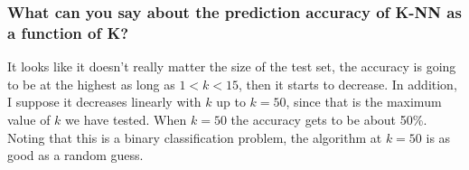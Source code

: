 \documentclass[a4paper,12pt]{article}
\begin{document}
\subsubsection{What can you say about the prediction accuracy of K-NN as a
	function of K?}

It looks like it doesn't really matter the size of the test set, the accuracy is
going to be at the highest as long as $1 < k < 15$, then it starts to decrease.
In addition, I suppose it decreases linearly with $k$ up to $k = 50$, since that is
the maximum value of $k$ we have tested. When $k = 50$ the accuracy gets to be
about 50\%. Noting that this is a binary classification problem, the algorithm
at $k = 50$ is as good as a random guess.

\end{document}

